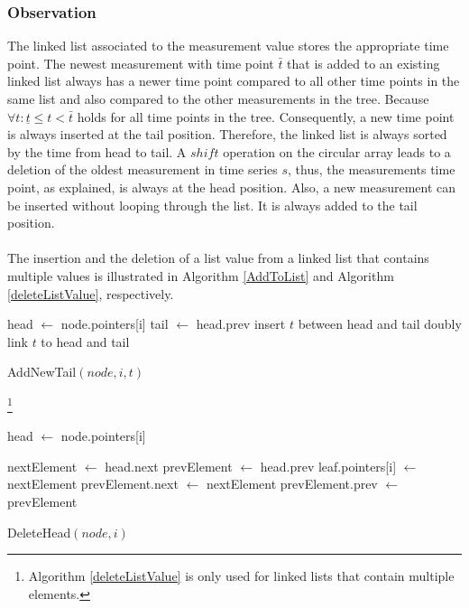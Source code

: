 \documentclass[abstracton,12pt,oneside]{scrreprt}
\begin{document}
\subsubsection{Observation}
The linked list associated to the measurement value stores the appropriate time point. The newest measurement with time point $\bar{t}$ that is added to an existing linked list always has a newer time point compared to all other time points in the same list and also compared to the other measurements in the tree. Because $\forall t: \underline{t} \leq t < \bar{t}$ holds for all time points in the tree. Consequently, a new time point is always inserted at the tail position. Therefore, the linked list is always sorted by the time from head to tail. A $shift$ operation on the circular array leads to a deletion of the oldest measurement in time series $s$, thus, the measurements time point, as explained, is always at the head position. Also, a new measurement can be inserted without looping through the list. It is always added to the tail position.\\ \\
The insertion and the deletion of a list value from a linked list that contains multiple values is illustrated in Algorithm \ref{AddToList} and Algorithm \ref{deleteListValue}, respectively.
\BlankLine
\begin{algorithm}[H]
	\IncMargin{1em}
	\SetAlgoLined
	\DontPrintSemicolon

		head $\leftarrow$ node.pointers[i]\;
		tail $\leftarrow$ head.prev\; 
		insert $t$ between head and tail\;	
		doubly link $t$ to head and tail\;
	
	
	\caption{AddNewTail$(node, i, t)$}
	\label{AddToList}
\end{algorithm}


\renewcommand*\footnoterule{}


\begin{algorithm}[H]
	\IncMargin{1em}
	\DontPrintSemicolon
	\footnote{Algorithm \ref{deleteListValue} is only used for linked lists that contain multiple elements.}

	head $\leftarrow$ node.pointers[i]\;
	
	nextElement $\leftarrow$ head.next\; 
	prevElement $\leftarrow$ head.prev\; 
	\BlankLine
	leaf.pointers[i] $\leftarrow$  nextElement\;
	prevElement.next $\leftarrow$ nextElement\;
	prevElement.prev $\leftarrow$ prevElement\;


	\caption{DeleteHead$(node, i)$}
		\label{deleteListValue}
\end{algorithm}
\end{document}
